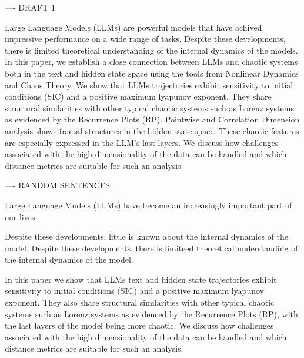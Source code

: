 ---- DRAFT 1


Large Language Models (LLMs) are powerful models that have achived impressive performance on a wide range of tasks.
Despite these developments, there is limited theoretical understanding of the internal dynamics of the models. In this paper, we establish a close connection between LLMs and chaotic systems both in the text and hidden state space using the tools from Nonlinear Dynamics and Chaos Theory. We show that LLMs 
trajectories exhibit sensitivity to initial conditions (SIC) and a positive maximum lyapunov exponent. They share structural similarities with other typical chaotic systems such as Lorenz systems as evidenced by the Recurrence Plots (RP). Pointwise and Correlation Dimension analysis shows fractal structures in the hidden state space. These chaotic features are especially expressed in the LLM's last layers. We discuss how challenges associated with the high dimensionality of the data can be handled and which distance metrics are suitable for such an analysis.







---- RANDOM SENTENCES

Large Language Models (LLMs) have become an increasingly important part of our lives.

Despite these developments, little is known about the internal dynamics of the model.
Despite these developments, there is limiteed theoretical understanding of the internal dynamics of the model.




In this paper we show that LLMs text and hidden state trajectories exhibit sensitivity to initial conditions (SIC) and a positive maximum lyapunov exponent. They also share structural similarities with other typical chaotic systems such as Lorenz systems as evidenced by the Recurrence Plots (RP), with the last layers of the model being more chaotic. We discuss how challenges associated with the high dimensionality of the data can be handled and which distance metrics are suitable for such an analysis.

